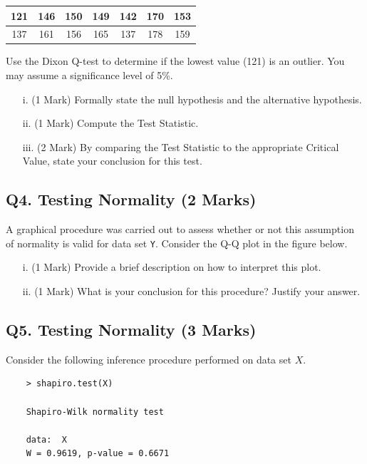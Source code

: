 \documentclass[a4paper,12pt]{article}
\begin{document}
\begin{center}
\begin{tabular}{|c|c|c|c|c|c|c|}
\hline
121 & 146 & 150 &149 &142 &170& 153\\ \hline
 137 & 161 & 156& 165& 137& 178& 159
\\ \hline
\end{tabular}
\end{center}
Use the Dixon Q-test to determine if the lowest value (121) is an outlier. You may assume a significance level of 5\%.

\begin{itemize}
\item[i.] (1 Mark) Formally state the null hypothesis and the alternative hypothesis.
\item[ii.] (1 Mark) Compute the Test Statistic.
\item[iii.] (2 Mark) By comparing the Test Statistic to the appropriate Critical Value, state your conclusion for this test.
\end{itemize}

\subsection*{Q4. Testing Normality (2 Marks)} %
A graphical procedure was carried out to assess whether or not this assumption of normality is valid for data set \texttt{Y}. Consider the Q-Q plot in the figure below.


\begin{itemize}
	\item[i.] (1 Mark) Provide a brief description on how to interpret this plot.
	\item[ii.] (1 Mark) What is your conclusion for this procedure? Justify your answer.
\end{itemize}
\newpage
\subsection*{Q5. Testing Normality (3 Marks)} %
Consider the following inference procedure performed on data set $X$.
\begin{center}
	\begin{verbatim}
	> shapiro.test(X)
	
	Shapiro-Wilk normality test
	
	data:  X
	W = 0.9619, p-value = 0.6671
	
	\end{verbatim}
\end{center}
\end{document}

